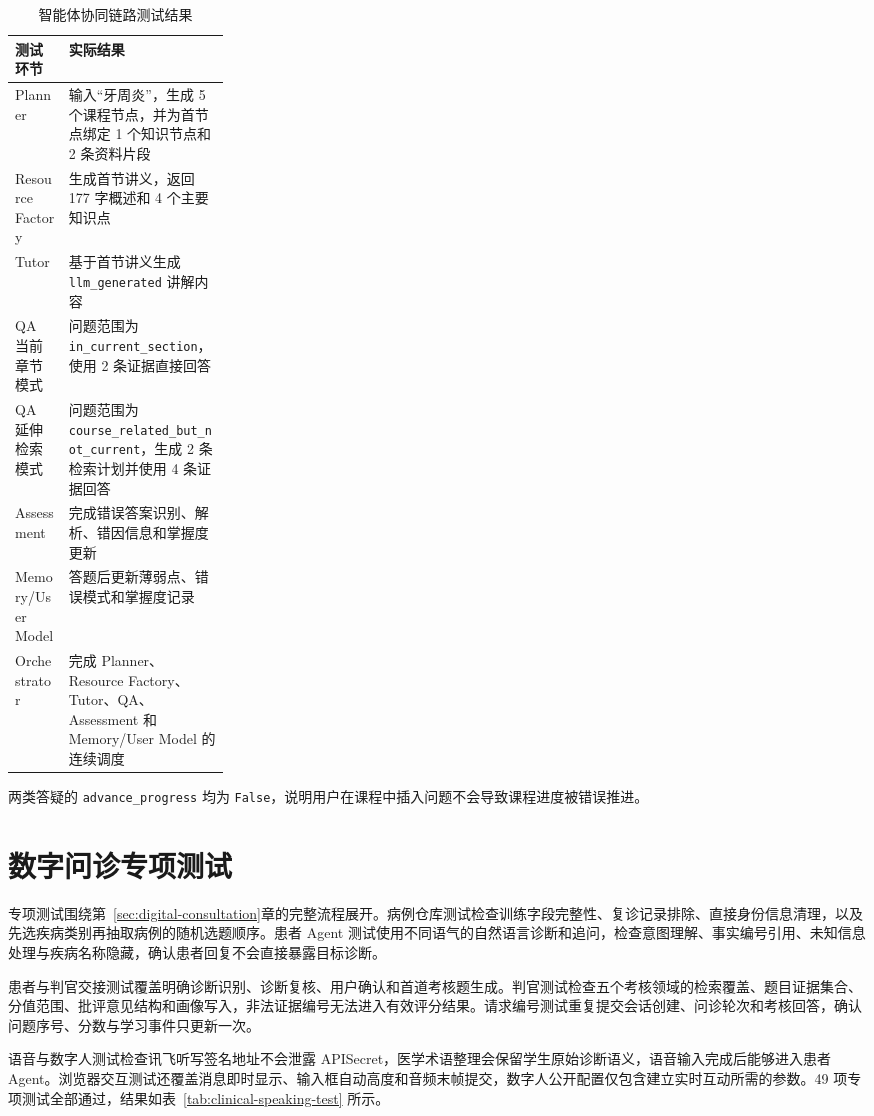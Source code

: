 \begin{table}[H]
  \centering
  \caption{智能体协同链路测试结果}
  \label{tab:agent-chain-test}
  \begin{tabularx}{\linewidth}{p{0.25\linewidth}X}
    \toprule
    测试环节 & 实际结果 \\
    \midrule
    Planner & 输入“牙周炎”，生成 5 个课程节点，并为首节点绑定 1 个知识节点和 2 条资料片段 \\
    Resource Factory & 生成首节讲义，返回 177 字概述和 4 个主要知识点 \\
    Tutor & 基于首节讲义生成 \texttt{llm\_generated} 讲解内容 \\
    QA 当前章节模式 & 问题范围为 \texttt{in\_current\_section}，使用 2 条证据直接回答 \\
    QA 延伸检索模式 & 问题范围为 \texttt{course\_related\_but\_not\_current}，生成 2 条检索计划并使用 4 条证据回答 \\
    Assessment & 完成错误答案识别、解析、错因信息和掌握度更新 \\
    Memory/User Model & 答题后更新薄弱点、错误模式和掌握度记录 \\
    Orchestrator & 完成 Planner、Resource Factory、Tutor、QA、Assessment 和 Memory/User Model 的连续调度 \\
    \bottomrule
  \end{tabularx}
\end{table}

两类答疑的 \texttt{advance\_progress} 均为 \texttt{False}，说明用户在课程中插入问题不会导致课程进度被错误推进。

\section{数字问诊专项测试}

专项测试围绕第~\ref{sec:digital-consultation}章的完整流程展开。病例仓库测试检查训练字段完整性、复诊记录排除、直接身份信息清理，以及先选疾病类别再抽取病例的随机选题顺序。患者 Agent 测试使用不同语气的自然语言诊断和追问，检查意图理解、事实编号引用、未知信息处理与疾病名称隐藏，确认患者回复不会直接暴露目标诊断。

患者与判官交接测试覆盖明确诊断识别、诊断复核、用户确认和首道考核题生成。判官测试检查五个考核领域的检索覆盖、题目证据集合、分值范围、批评意见结构和画像写入，非法证据编号无法进入有效评分结果。请求编号测试重复提交会话创建、问诊轮次和考核回答，确认问题序号、分数与学习事件只更新一次。

语音与数字人测试检查讯飞听写签名地址不会泄露 APISecret，医学术语整理会保留学生原始诊断语义，语音输入完成后能够进入患者 Agent。浏览器交互测试还覆盖消息即时显示、输入框自动高度和音频末帧提交，数字人公开配置仅包含建立实时互动所需的参数。49 项专项测试全部通过，结果如表~\ref{tab:clinical-speaking-test} 所示。

